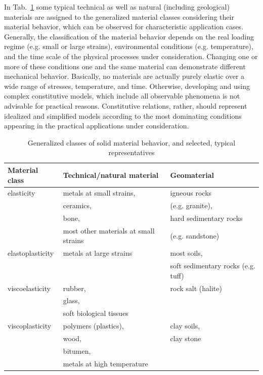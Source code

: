 In Tab.~\ref{tab:matclass} some typical technical as well as natural (including geological) materials are assigned to the generalized material classes considering their material behavior, which can be observed for characteristic application cases. Generally, the classification of the material behavior depends on the real loading regime (e.g. small or large strains), environmental conditions (e.g. temperature), and the time scale of the physical processes under consideration. Changing one or more of these conditions one and the same material can demonstrate different mechanical behavior. Basically, no materials are actually purely elastic over a wide range of stresses, temperature, and time. Otherwise, developing and using complex constitutive models, which include all observable phenomena is not advisable for practical reasons. Constitutive relations, rather, should represent idealized and simplified models according to the most dominating conditions appearing in the practical applications under consideration.

\renewcommand{\arraystretch}{1.25}
\begin{table}[htb!]
\caption{Generalized classes of solid material behavior, and selected, typical representatives}
\label{tab:matclass}
\begin{center}
\begin{tabular}{|p{}||p{}|p{}|}
\hline
Material class & Technical/natural material & Geomaterial \\
\hline\hline
elasticity & metals at small strains, & igneous rocks                 \\
           & ceramics,                & (e.g. granite),               \\
           & bone,                    & hard sedimentary rocks        \\
           & most other materials at small strains & (e.g. sandstone) \\
\hline
elastoplasticity & metals at large strains & most soils,                        \\
                 &                         & soft sedimentary rocks (e.g. tuff) \\
\hline
viscoelasticity & rubber,                 & rock salt (halite) \\
                & glass,                  &                    \\
                & soft biological tissues &                    \\
\hline
viscoplasticity & polymers (plastics),       & clay soils, \\
                & wood,                      & clay stone  \\
                & bitumen,                   &             \\
                & metals at high temperature &             \\
\hline
\end{tabular}
\end{center}
\end{table}
\renewcommand{\arraystretch}{1.00}
%
\hfill
\newpage
